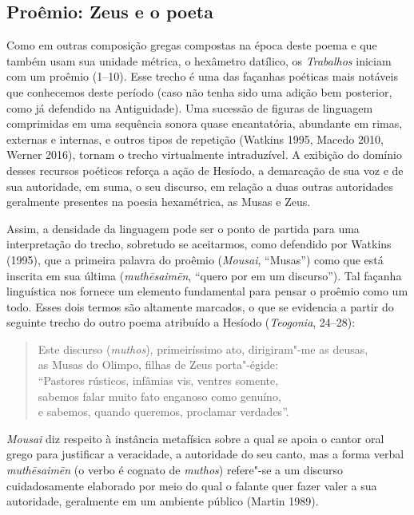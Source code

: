 

\subsection{Proêmio: Zeus e o poeta}

Como em outras composição gregas compostas na época deste poema e que
também usam sua unidade métrica, o hexâmetro datílico, os
\emph{Trabalhos} iniciam com um proêmio (1--10). Esse trecho é uma das
façanhas poéticas mais notáveis que conhecemos deste período (caso não
tenha sido uma adição bem posterior, como já defendido na Antiguidade).
Uma sucessão de figuras de linguagem comprimidas em uma sequência sonora
quase encantatória, abundante em rimas, externas e internas, e outros
tipos de repetição (Watkins 1995, Macedo 2010, Werner 2016), tornam o
trecho virtualmente intraduzível. A exibição do domínio desses recursos
poéticos reforça a ação de Hesíodo, a demarcação de sua voz e de sua
autoridade, em suma, o seu discurso, em relação a duas outras
autoridades geralmente presentes na poesia hexamétrica, as Musas e Zeus.

Assim, a densidade da linguagem pode ser o ponto de partida para uma
interpretação do trecho, sobretudo se aceitarmos, como defendido por
Watkins (1995), que a primeira palavra do proêmio (\emph{Mousai},
``Musas'') como que está inscrita em sua última
(\emph{\emph{muthēsaimēn}}, ``quero por em um discurso''). Tal façanha
linguística nos fornece um elemento fundamental para pensar o proêmio
como um todo. Esses dois termos são altamente marcados, o que se
evidencia a partir do seguinte trecho do outro poema atribuído a Hesíodo
(\emph{Teogonia}, 24--28):

\begin{verse}
Este discurso (\emph{muthos}), primeiríssimo ato, dirigiram"-me as deusas,\\
as Musas do Olimpo, filhas de Zeus porta"-égide:\\
``Pastores rústicos, infâmias vis, ventres somente,\\
sabemos falar muito fato enganoso como genuíno,\\
e sabemos, quando queremos, proclamar verdades''.
\end{verse}

\emph{Mousai} diz respeito à instância metafísica sobre a qual se apoia
o cantor oral grego para justificar a veracidade, a autoridade do seu
canto, mas a forma verbal \emph{muthēsaimēn} (o verbo é cognato de
\emph{muthos}) refere"-se a um discurso cuidadosamente elaborado por meio
do qual o falante quer fazer valer a sua autoridade, geralmente em um
ambiente público (Martin 1989).

